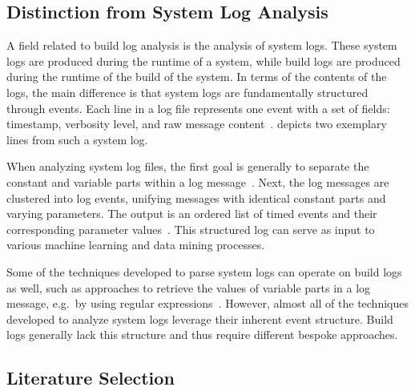 \subsection{Distinction from System Log Analysis}
\label{sec:system-log-analysis}

A field related to build log analysis is the analysis of system logs.
These system logs are produced during the runtime of a system, while
build logs are produced during the runtime of the build of the system.
In terms of the contents of the logs, the main difference is that system
logs are fundamentally structured
through events.
Each line in a log file represents one event with a
set of fields: timestamp, verbosity level, and raw message
content~\cite{he2017towards}.
 depicts two
exemplary lines from such a system log.

When analyzing system log files, the first goal is generally to
separate the constant and variable parts within a log
message~\cite{nagappan2010abstracting,he2017towards}.
Next, the log
messages are clustered into log events, unifying messages with
identical constant parts and varying parameters.
The output is an ordered list of timed events and their corresponding
parameter values~\cite{he2016evaluation}.
This structured log can serve as input to various machine learning and
data mining processes.

Some of the techniques developed to parse system logs can operate
on build logs as well, such as approaches to retrieve the
values of variable parts in a log message, e.g.\, by using regular
expressions~\cite{nagappan2010abstracting,xu2009detecting}.
However, almost all of the techniques developed to analyze system logs
leverage their inherent event structure.
Build logs generally lack this structure and thus require different
bespoke approaches.

\subsection{Literature Selection}
\label{sec:litsel}

